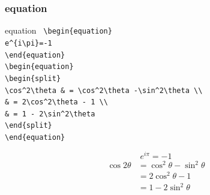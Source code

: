 \subsubsection{equation}
\begin{itembox}[c]{equation}
  \texttt{
    \hspace{-0.5\zw}\textbackslash begin\{equation\}\\
    \hspace{2\zw}e\textasciicircum\{i\textbackslash pi\}=-1\\
    \textbackslash end\{equation\}\\
    \textbackslash begin\{equation\}\\
    \hspace{2\zw}\textbackslash begin\{split\}\\
    \hspace{4\zw}\textbackslash cos\textasciicircum2\textbackslash theta \& = \textbackslash cos\textasciicircum2\textbackslash theta -\textbackslash sin\textasciicircum2\textbackslash theta \textbackslash \textbackslash\\
    \hspace{4\zw}\& = 2\textbackslash cos\textasciicircum2\textbackslash theta - 1          \textbackslash \textbackslash\\
    \hspace{4\zw}\& = 1 - 2\textbackslash sin\textasciicircum2\textbackslash theta\\
    \hspace{2\zw}\textbackslash end\{split\}\\
    \textbackslash end\{equation\}
  }
\end{itembox}
\begin{equation}
  e^{i\pi}=-1
\end{equation}
\begin{equation}
  \begin{split}
    \cos 2\theta & = \cos^2\theta -\sin^2\theta \\
                 & = 2\cos^2\theta - 1          \\
                 & = 1 - 2\sin^2\theta
  \end{split}
\end{equation}

